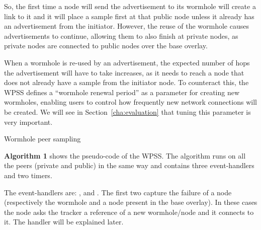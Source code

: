 So, the first time a node will send the advertisement to its wormhole will create a link to it and it will place a sample first at that public node unless it already has an advertisement from the initiator. However, the reuse of the wormhole causes advertisements to continue, allowing them to also finish at private nodes, as private nodes are connected to public nodes over the base overlay. 

When a wormhole is re-used by an advertisement, the expected number of hops the advertisement will have to take increases, as it needs to reach a node that does not already have a sample from the initiator node. To counteract this, the \ac{WPSS} defines a ``wormhole renewal period'' as a parameter for creating new wormholes, enabling users to control how frequently new network connections will be created. We will see in Section~\ref{cha:evaluation} that tuning this parameter is very important. 


\begin{algorithm}[H]






 \caption{Wormhole peer sampling}
\end{algorithm}

\textbf{Algorithm 1} shows the pseudo-code of the \ac{WPSS}. The algorithm runs on all the peers (private and public) in the same way and contains three event-handlers and two timers. 

The event-handlers are: \wormholeFailure, \baseOverlayFailure and \receivedAd. The first two capture the failure of a node (respectively the wormhole and a node present in the base overlay). In these cases the node asks the tracker a reference of a new wormhole/node and it connects to it. The \receivedAd handler will be explained later.

